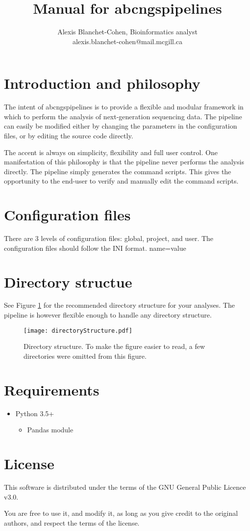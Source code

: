 \documentclass[12pt]{article}
\title{ Manual for abcngspipelines }
\author{ Alexis Blanchet-Cohen, Bioinformatics analyst \\ alexis.blanchet-cohen@mail.mcgill.ca}
\begin{document}
\maketitle
\thispagestyle{empty} %

\newpage
\tableofcontents
\newpage

\section{Introduction and philosophy}

The intent of abcngspipelines is to provide a flexible and modular framework in which to perform the analysis of next-generation sequencing data.
The pipeline can easily be modified either by changing the parameters in the configuration files, or by editing the source code directly.

The accent is always on simplicity, flexibility and full user control.
One manifestation of this philosophy is that the pipeline never performs the analysis directly. The pipeline simply generates the command scripts. This gives the opportunity to the end-user to verify and manually edit the command scripts.

\section{Configuration files}
There are 3 levels of configuration files: global, project, and user.
The configuration files should follow the INI format.
\newline
[section]
\newline
name=value

\section{Directory structue}
See Figure \ref{figure:directorystructure} for the recommended directory structure for your analyses.
The pipeline is however flexible enough to handle any directory structure.

\begin{figure}[htb]
\centering
\texttt{[image: directoryStructure.pdf]}
\caption{Directory structure. To make the figure easier to read, a few directories were omitted from this figure.}
\label{figure:directorystructure}
\end{figure}

\section{Requirements}
\begin{itemize}
    \item{Python 3.5+}
    \begin{itemize}
	\item{Pandas module}
    \end{itemize}
\end{itemize}

\section{License}
This software is distributed under the terms of the GNU General Public Licence v3.0.

You are free to use it, and modify it, as long as you give credit to the original authors, and respect the terms of the license.

\clearpage


\end{document}
